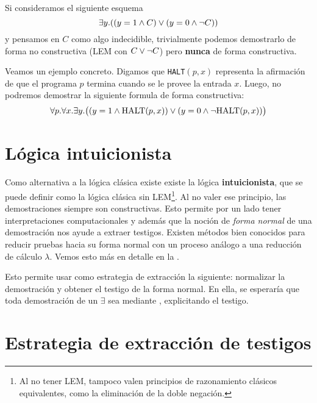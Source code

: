 \begin{ejemplo}
    Si consideramos el siguiente esquema
    \[
        \exists y . ((y = 1 \wedge C) \vee (y = 0 \wedge \neg C))
    \]
    y pensamos en $C$ como algo indecidible, trivialmente podemos demostrarlo de
    forma no constructiva (LEM con $C \vee \neg C$) pero \textbf{nunca} de
    forma constructiva.

    Veamos un ejemplo concreto. Digamos que \texttt{HALT}$(p ,x)$ representa la afirmación de que el programa $p$ termina cuando se le provee la entrada $x$. Luego, no podremos demostrar la siguiente formula de forma constructiva:
    \[
        \forall p . \forall x . \exists y .
        \big(
            (y = 1 \wedge \textrm{HALT}(p, x))
            \vee
            (y = 0 \wedge \neg \textrm{HALT}(p, x))
        \big)
    \]
\end{ejemplo}

\section{Lógica intuicionista}

Como alternativa a la lógica clásica existe existe la lógica
\textbf{intuicionista}, que se puede definir como la lógica clásica sin
LEM\footnote{Al no tener LEM, tampoco valen principios de razonamiento clásicos
equivalentes, como la eliminación de la doble negación.}. Al no valer ese
principio, las demostraciones siempre son constructivas. Esto permite por un
lado tener interpretaciones computacionales y además que
la noción de \textit{forma normal} de una demostración nos ayude a extraer testigos. Existen métodos
bien conocidos para reducir pruebas hacia su forma normal con un proceso análogo
a una reducción de cálculo $\lambda$. Vemos esto más en detalle en la .

Esto permite usar como estrategia de extracción la siguiente: normalizar la
demostración y obtener el testigo de la forma normal. En ella, se esperaría que
toda demostración de un $\exists$ sea mediante , explicitando el
testigo.

\section{Estrategia de extracción de testigos}

